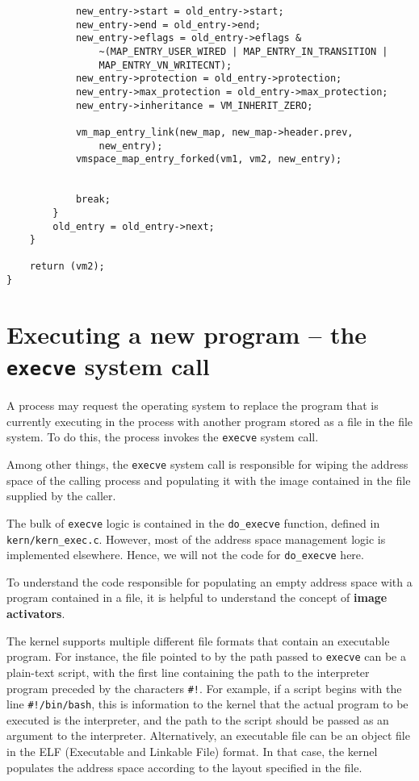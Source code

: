 \documentclass[shortabstract, english]{iithesis}
\newenvironment{code}{}{}
\begin{document}
\begin{code}
\begin{verbatim}
            new_entry->start = old_entry->start;
            new_entry->end = old_entry->end;
            new_entry->eflags = old_entry->eflags &
                ~(MAP_ENTRY_USER_WIRED | MAP_ENTRY_IN_TRANSITION |
                MAP_ENTRY_VN_WRITECNT);
            new_entry->protection = old_entry->protection;
            new_entry->max_protection = old_entry->max_protection;
            new_entry->inheritance = VM_INHERIT_ZERO;

            vm_map_entry_link(new_map, new_map->header.prev,
                new_entry);
            vmspace_map_entry_forked(vm1, vm2, new_entry);


            break;
        }
        old_entry = old_entry->next;
    }

    return (vm2);
}
\end{verbatim}
\end{code}

\section{Executing a new program -- the \texttt{execve} system call}

A process may request the operating system to replace the program that is
currently executing in the process with another program stored as a file in the
file system. To do this, the process invokes the \texttt{execve} system call.

Among other things, the \texttt{execve} system call is responsible for wiping
the address space of the calling process and populating it with the image
contained in the file supplied by the caller.

The bulk of \texttt{execve} logic is contained in the \texttt{do_execve}
function, defined in \texttt{kern/kern\_exec.c}. However, most of the address
space management logic is implemented elsewhere. Hence, we will not the code for
\texttt{do_execve} here.

To understand the code responsible for populating an empty address space with a
program contained in a file, it is helpful to understand the concept of
\textbf{image activators}.

The kernel supports multiple different file formats that contain an executable
program. For instance, the file pointed to by the path passed to \texttt{execve}
can be a plain-text script, with the first line containing the path to the
interpreter program preceded by the characters \texttt{\#!}. For example, if a
script begins with the line \texttt{\#!/bin/bash}, this is information to the
kernel that the actual program to be executed is the interpreter, and the path
to the script should be passed as an argument to the interpreter. Alternatively,
an executable file can be an object file in the ELF (Executable and Linkable
File) format. In that case, the kernel populates the address space according to
the layout specified in the file.
\end{document}
